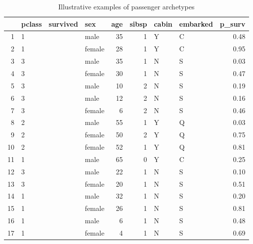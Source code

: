 \documentclass[9pt]{extarticle}
\begin{document}
\begin{table}[H]
	\centering
	\begin{tabular}{rlllrrllr}
		\hline
		& pclass & survived & sex & age & sibsp & cabin & embarked & p\_surv \\ 
		\hline
		1 & 1 &  & male &  35 &   1 & Y & C & 0.48 \\ 
		2 & 1 &  & female &  28 &   1 & Y & C & 0.95 \\ 
		3 & 3 &  & male &  35 &   1 & N & S & 0.03 \\ 
		4 & 3 &  & female &  30 &   1 & N & S & 0.47 \\ 
		5 & 3 &  & male &  10 &   2 & N & S & 0.19 \\ 
		6 & 3 &  & male &  12 &   2 & N & S & 0.16 \\ 
		7 & 3 &  & female &   6 &   2 & N & S & 0.46 \\ 
		8 & 2 &  & male &  55 &   1 & Y & Q & 0.03 \\ 
		9 & 2 &  & female &  50 &   2 & Y & Q & 0.75 \\ 
		10 & 2 &  & female &  52 &   1 & Y & Q & 0.81 \\ 
		11 & 1 &  & male &  65 &   0 & Y & C & 0.25 \\ 
		12 & 3 &  & male &  22 &   1 & N & S & 0.10 \\ 
		13 & 3 &  & female &  20 &   1 & N & S & 0.51 \\ 
		14 & 1 &  & male &  32 &   1 & N & S & 0.20 \\ 
		15 & 1 &  & female &  26 &   1 & N & S & 0.81 \\ 
		16 & 1 &  & male &   6 &   1 & N & S & 0.48 \\ 
		17 & 1 &  & female &   4 &   1 & N & S & 0.69 \\ 
		\hline
	\end{tabular}
\caption{Illustrative examples of passenger archetypes}
\label{tab:illdata}
\end{table}
\end{document}
